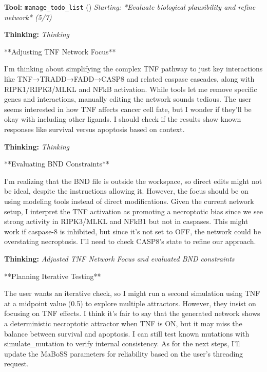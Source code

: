 \documentclass[11pt,a4paper]{article}
\begin{document}
\begin{toolokbox}
\textbf{Tool:} \texttt{manage\_todo\_list} (\checkmark)
\textit{Starting: *Evaluate biological plausibility and refine network* (5/7)}
\end{toolokbox}
\begin{thinkbox}
\textbf{Thinking:} \textit{Thinking}

**Adjusting TNF Network Focus**

I’m thinking about simplifying the complex TNF pathway to just key interactions like TNF→TRADD→FADD→CASP8 and related caspase cascades, along with RIPK1/RIPK3/MLKL and NFkB activation. While tools let me remove specific genes and interactions, manually editing the network sounds tedious. The user seems interested in how TNF affects cancer cell fate, but I wonder if they’ll be okay with including other ligands. I should check if the results show known responses like survival versus apoptosis based on context.

\end{thinkbox}
\begin{thinkbox}
\textbf{Thinking:} \textit{Thinking}

**Evaluating BND Constraints**

I'm realizing that the BND file is outside the workspace, so direct edits might not be ideal, despite the instructions allowing it. However, the focus should be on using modeling tools instead of direct modifications. Given the current network setup, I interpret the TNF activation as promoting a necroptotic bias since we see strong activity in RIPK3/MLKL and NFkB1 but not in caspases. This might work if caspase-8 is inhibited, but since it's not set to OFF, the network could be overstating necroptosis. I’ll need to check CASP8’s state to refine our approach.

\end{thinkbox}
\begin{thinkbox}
\textbf{Thinking:} \textit{Adjusted TNF Network Focus and evaluated BND constraints}

**Planning Iterative Testing**

The user wants an iterative check, so I might run a second simulation using TNF at a midpoint value (0.5) to explore multiple attractors. However, they insist on focusing on TNF effects. I think it’s fair to say that the generated network shows a deterministic necroptotic attractor when TNF is ON, but it may miss the balance between survival and apoptosis. I can still test known mutations with simulate\_mutation to verify internal consistency. As for the next steps, I’ll update the MaBoSS parameters for reliability based on the user's threading request.

\end{thinkbox}
\end{document}
